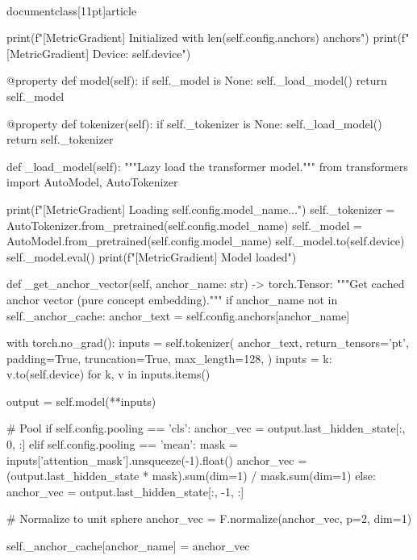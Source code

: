 \\documentclass[11pt]{article}
\begin{document}
\begin{CodeBlock}
        print(f"[MetricGradient] Initialized with {len(self.config.anchors)} anchors")
        print(f"[MetricGradient] Device: {self.device}")
    
    @property
    def model(self):
        if self._model is None:
            self._load_model()
        return self._model
    
    @property
    def tokenizer(self):
        if self._tokenizer is None:
            self._load_model()
        return self._tokenizer
    
    def _load_model(self):
        """Lazy load the transformer model."""
        from transformers import AutoModel, AutoTokenizer
        
        print(f"[MetricGradient] Loading {self.config.model_name}...")
        self._tokenizer = AutoTokenizer.from_pretrained(self.config.model_name)
        self._model = AutoModel.from_pretrained(self.config.model_name)
        self._model.to(self.device)
        self._model.eval()
        print(f"[MetricGradient] Model loaded")
    
    def _get_anchor_vector(self, anchor_name: str) -> torch.Tensor:
        """Get cached anchor vector (pure concept embedding)."""
        if anchor_name not in self._anchor_cache:
            anchor_text = self.config.anchors[anchor_name]
            
            with torch.no_grad():
                inputs = self.tokenizer(
                    anchor_text, 
                    return_tensors='pt', 
                    padding=True, 
                    truncation=True,
                    max_length=128,
                )
                inputs = {k: v.to(self.device) for k, v in inputs.items()}
                
                output = self.model(**inputs)
                
                # Pool
                if self.config.pooling == 'cls':
                    anchor_vec = output.last_hidden_state[:, 0, :]
                elif self.config.pooling == 'mean':
                    mask = inputs['attention_mask'].unsqueeze(-1).float()
                    anchor_vec = (output.last_hidden_state * mask).sum(dim=1) / mask.sum(dim=1)
                else:
                    anchor_vec = output.last_hidden_state[:, -1, :]
                
                # Normalize to unit sphere
                anchor_vec = F.normalize(anchor_vec, p=2, dim=1)
                
                self._anchor_cache[anchor_name] = anchor_vec
        

\end{CodeBlock}
\end{document}
